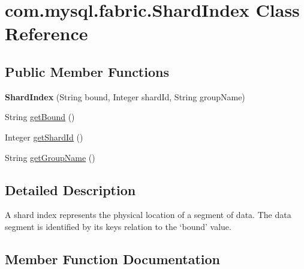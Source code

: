 \hypertarget{classcom_1_1mysql_1_1fabric_1_1_shard_index}{}\section{com.\+mysql.\+fabric.\+Shard\+Index Class Reference}
\label{classcom_1_1mysql_1_1fabric_1_1_shard_index}
\subsection*{Public Member Functions}
\begin{DoxyCompactItemize}
\item 
\mbox{\label{classcom_1_1mysql_1_1fabric_1_1_shard_index_a8628fa64ce15a11c8cb2a5b3df4580c1}} 
{\bfseries Shard\+Index} (String bound, Integer shard\+Id, String group\+Name)
\item 
String \mbox{\hyperlink{classcom_1_1mysql_1_1fabric_1_1_shard_index_a12dd3c50d26f9a14139eb61cc3565b27}{get\+Bound}} ()
\item 
Integer \mbox{\hyperlink{classcom_1_1mysql_1_1fabric_1_1_shard_index_a6e58c9b169c3978e86c12060f71680b6}{get\+Shard\+Id}} ()
\item 
String \mbox{\hyperlink{classcom_1_1mysql_1_1fabric_1_1_shard_index_a4ffb7b10c54b394c2a7d17d53e04a83a}{get\+Group\+Name}} ()
\end{DoxyCompactItemize}


\subsection{Detailed Description}
A shard index represents the physical location of a segment of data. The data segment is identified by it\textquotesingle{}s key\textquotesingle{}s relation to the `bound' value. 

\subsection{Member Function Documentation}
\mbox{\label{classcom_1_1mysql_1_1fabric_1_1_shard_index_a12dd3c50d26f9a14139eb61cc3565b27}} 
